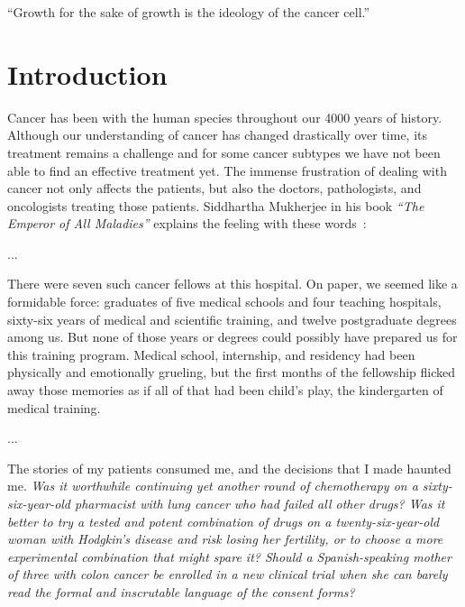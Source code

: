 
\begin{savequote}[.5\linewidth]
  ``Growth for the sake of growth is the ideology of the cancer cell.''
\end{savequote}
\chapter{Introduction}
\label{ch:intro}
Cancer has been with the human species throughout our 4000 years of history.
Although our understanding of cancer has changed drastically over time, its
treatment remains a challenge and for some cancer subtypes we have not been
able to find an effective treatment yet. The immense frustration of dealing
with cancer not only affects the patients, but also the doctors, pathologists,
and oncologists treating those patients. Siddhartha Mukherjee in his book
\emph{``The Emperor of All Maladies''} explains the feeling with these
words~\cite[prologue]{the-emperor-of-all-maladies}:

\begin{displayquote}
  ...
  
  There were seven such cancer fellows at this hospital. On paper, we seemed
  like a formidable force: graduates of five medical schools and four teaching
  hospitals, sixty-six years of medical and scientific training, and twelve
  postgraduate degrees among us. But none of those years or degrees could
  possibly have prepared us for this training program. Medical school,
  internship, and residency had been physically and emotionally grueling, but
  the first months of the fellowship flicked away those memories as if all of
  that had been child's play, the kindergarten of medical training.

  ...

  The stories of my patients consumed me, and the decisions that I made haunted
  me. \emph{Was it worthwhile continuing yet another round of chemotherapy on a
    sixty-six-year-old pharmacist with lung cancer who had failed all other
    drugs? Was it better to try a tested and potent combination of drugs on a
    twenty-six-year-old woman with Hodgkin's disease and risk losing her
    fertility, or to choose a more experimental combination that might spare
    it? Should a Spanish-speaking mother of three with colon cancer be enrolled
    in a new clinical trial when she can barely read the formal and inscrutable
    language of the consent forms?}
\end{displayquote}

